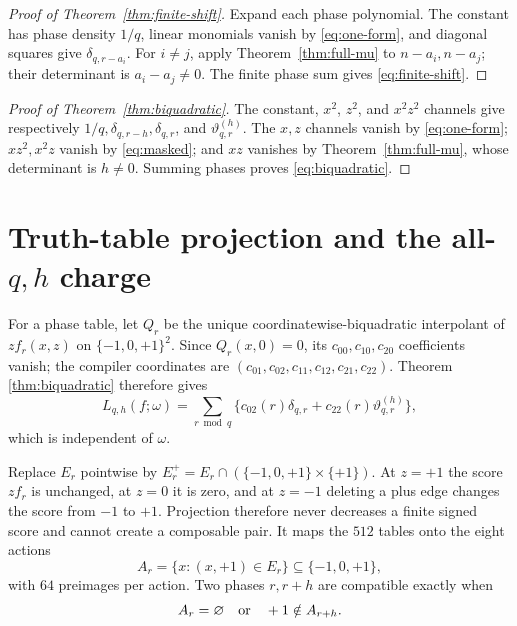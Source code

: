 \documentclass[11pt]{article}
\theoremstyle{definition}
\theoremstyle{remark}
\newcommand{\T}{\{-1,0,+1\}}
\newcommand{\dd}{\delta}
\newcommand{\thh}{\vartheta}
\begin{document}
\begin{proof}[Proof of Theorem~\ref{thm:finite-shift}]
Expand each phase polynomial.  The constant has phase density \(1/q\),
linear monomials vanish by \eqref{eq:one-form}, and diagonal squares give
\(\dd_{q,r-a_i}\).  For \(i\ne j\), apply
Theorem~\ref{thm:full-mu} to \(n-a_i,n-a_j\); their determinant is
\(a_i-a_j\ne0\).  The finite phase sum gives \eqref{eq:finite-shift}.
\end{proof}

\begin{proof}[Proof of Theorem~\ref{thm:biquadratic}]
The constant, \(x^2\), \(z^2\), and \(x^2z^2\) channels give respectively
\(1/q,\dd_{q,r-h},\dd_{q,r}\), and \(\thh^{(h)}_{q,r}\).
The \(x,z\) channels vanish by \eqref{eq:one-form}; \(xz^2,x^2z\) vanish
by \eqref{eq:masked}; and \(xz\) vanishes by
Theorem~\ref{thm:full-mu}, whose determinant is \(h\ne0\).  Summing phases
proves \eqref{eq:biquadratic}.
\end{proof}

\section{Truth-table projection and the all-\texorpdfstring{$q,h$}{q,h} charge}

For a phase table, let \(Q_r\) be the unique coordinatewise-biquadratic
interpolant of \(zf_r(x,z)\) on \(\T^2\).  Since \(Q_r(x,0)=0\), its
\(c_{00},c_{10},c_{20}\) coefficients vanish; the compiler coordinates are
\((c_{01},c_{02},c_{11},c_{12},c_{21},c_{22})\).  Theorem
\ref{thm:biquadratic} therefore gives
\begin{equation}
 L_{q,h}(f;\omega)=\sum_{r\bmod q}
 \{c_{02}(r)\dd_{q,r}+c_{22}(r)\thh^{(h)}_{q,r}\},
 \label{eq:table-limit}
\end{equation}
which is independent of \(\omega\).

Replace \(E_r\) pointwise by
\(E_r^+=E_r\cap(\T\times\{+1\})\).  At \(z=+1\) the score \(zf_r\) is
unchanged, at \(z=0\) it is zero, and at \(z=-1\) deleting a plus edge
changes the score from \(-1\) to \(+1\).  Projection therefore never
decreases a finite signed score and cannot create a composable pair.  It
maps the \(512\) tables onto the eight actions
\[
 A_r=\{x:(x,+1)\in E_r\}\subseteq\T,
\]
with \(64\) preimages per action.  Two phases \(r,r+h\) are compatible
exactly when
\begin{equation}
 A_r=\varnothing\quad\hbox{or}\quad +1\notin A_{r+h}.
 \label{eq:compatibility}
\end{equation}
\end{document}
